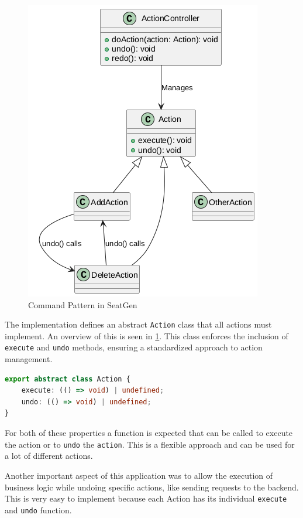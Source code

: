 \begin{figure}
    \centering
    \includegraphics[scale=0.5]{pics/command-pattern.png}
    \caption{Command Pattern in SeatGen}
    \label{fig:command-pattern}
\end{figure}

The implementation defines an abstract \texttt{Action} class that all actions must implement. An overview of this is seen in \ref{fig:command-pattern}. This class enforces the inclusion of \texttt{execute} and \texttt{undo} methods, ensuring a standardized approach to action management.

\begin{lstlisting}[language=TypeScript,caption={Action class},label={lst:action-class}]
export abstract class Action {
    execute: (() => void) | undefined;
    undo: (() => void) | undefined;
}
\end{lstlisting}

For both of these properties a function is expected that can be called to execute the action or to \texttt{undo} the \texttt{action}. This is a flexible approach and can be used for a lot of different actions. 

Another important aspect of this application was to allow the execution of business logic while undoing specific actions, like sending requests to the backend. This is very easy to implement because each Action has its individual \texttt{execute} and \texttt{undo} function.

